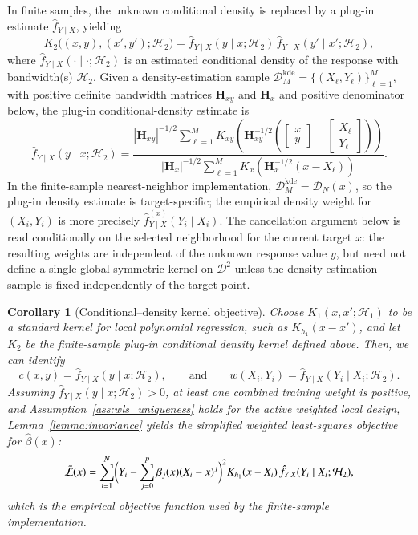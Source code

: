 \documentclass[preprint,1p,times,authoryear]{elsarticle}
\newtheorem{corollary}{Corollary}
\begin{document}
In finite samples, the unknown conditional density is replaced by a plug-in estimate \(\hat f_{Y\mid X}\), yielding
\[
K_2\!\bigl((x,y),(x',y');\mathcal{H}_2\bigr)
=\hat f_{Y\mid X}(y\mid x; \mathcal{H}_2)\,
\hat f_{Y\mid X}(y'\mid x'; \mathcal{H}_2),
\]
where $\hat f_{Y\mid X}(\cdot\mid\cdot; \mathcal{H}_2)$ is an estimated conditional density of the response with bandwidth(s) $\mathcal{H}_2$.
Given a density-estimation sample \(\mathcal D_M^{\mathrm{kde}}=\{(X_\ell,Y_\ell)\}_{\ell=1}^{M}\), with positive definite bandwidth matrices \(\mathbf H_{xy}\) and \(\mathbf H_x\) and positive denominator below, the plug-in conditional-density estimate is
\begin{equation}
\hat f_{Y\mid X}(y\mid x;\mathcal H_2)
=
\frac{
|\mathbf H_{xy}|^{-1/2}
\sum_{\ell=1}^{M}
K_{xy}\!\left(
\mathbf H_{xy}^{-1/2}
\left(
\begin{bmatrix}x\\y\end{bmatrix}
-
\begin{bmatrix}X_\ell\\Y_\ell\end{bmatrix}
\right)
\right)
}{
|\mathbf H_x|^{-1/2}
\sum_{\ell=1}^{M}
K_x\!\left(
\mathbf H_x^{-1/2}(x-X_\ell)
\right)
}.
\label{conditional_prob_est}
\end{equation}
In the finite-sample nearest-neighbor implementation, \(\mathcal D_M^{\mathrm{kde}}=\mathcal D_N(x)\), so the plug-in density estimate is target-specific; the empirical density weight for \((X_i,Y_i)\) is more precisely \(\hat f^{(x)}_{Y\mid X}(Y_i\mid X_i)\). The cancellation argument below is read conditionally on the selected neighborhood for the current target \(x\): the resulting weights are independent of the unknown response value \(y\), but need not define a single global symmetric kernel on \(\mathcal D^2\) unless the density-estimation sample is fixed independently of the target point.

\begin{corollary}[Conditional–density kernel objective]
\label{cor:cond_density_obj}
Choose $K_1(x,x';\mathcal{H}_1)$ to be a standard kernel for local polynomial regression, such as $K_{h_1}(x-x')$, and let $K_2$ be the finite-sample plug-in conditional density kernel defined above.
Then, we can identify
\[
c(x,y)=\hat f_{Y\mid X}(y\mid x; \mathcal{H}_2),
\qquad \text{and} \qquad
w(X_i,Y_i)=\hat f_{Y\mid X}(Y_i\mid X_i; \mathcal{H}_2).
\]
Assuming $\hat f_{Y\mid X}(y\mid x; \mathcal{H}_2) > 0$, at least one combined training weight is positive, and Assumption~\ref{ass:wls_uniqueness} holds for the active weighted local design, Lemma~\ref{lemma:invariance} yields the simplified weighted least-squares objective for $\hat\beta(x)$:
\[
\tilde{\mathcal{L}}(x)
=\sum_{i=1}^{N}
\Bigl(Y_i-\sum_{j=0}^{p}\beta_j(x)(X_i - x)^j\Bigr)^2
K_{h_1}(x-X_i)\,\hat f_{Y\mid X}(Y_i\mid X_i; \mathcal{H}_2),
\]
which is the empirical objective function used by the finite-sample implementation.
\end{corollary}
\end{document}
